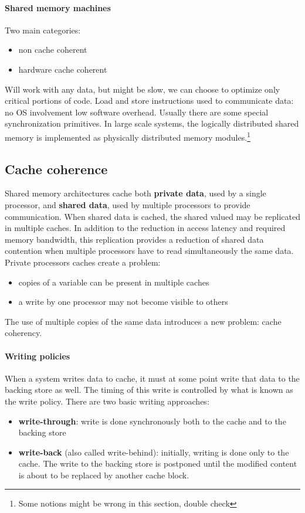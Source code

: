 \paragraph{Shared memory machines} Two main categories:
\begin{itemize}
    \item non cache coherent
    \item hardware cache coherent
\end{itemize}
Will work with any data, but might be slow, we can choose to optimize only critical portions of code.
Load and store instructions used to communicate data: no OS involvement \textrightarrow low software overhead.
Usually there are some special synchronization primitives.
In large scale systems, the logically distributed shared memory is implemented as physically distributed memory
modules.\footnote{Some notions might be wrong in this section, double check}

\subsection{Cache coherence}\label{subsec:cache-coherence}
Shared memory architectures cache both \textbf{private data}, used by a single processor, and \textbf{shared data},
used by multiple processors to provide communication.
When shared data is cached, the shared valued may be replicated in multiple caches.
In addition to the reduction in access latency and required memory bandwidth, this replication provides a reduction
of shared data contention when multiple processors have to read simultaneously the same data.
Private processors caches create a problem:
\begin{itemize}
    \item copies of a variable can be present in multiple caches
    \item a write by one processor may not become visible to others
\end{itemize}
The use of multiple copies of the same data introduces a new problem: cache coherency.

\paragraph{Writing policies}
When a system writes data to cache, it must at some point write that data to the backing store as well.
The timing of this write is controlled by what is known as the write policy.
There are two basic writing approaches:
\begin{itemize}
    \item \textbf{write-through}: write is done synchronously both to the cache and to the backing store
    \item \textbf{write-back} (also called write-behind): initially, writing is done only to the cache.
    The write to the backing store is postponed until the modified content is about to be replaced by another cache block.
\end{itemize}

